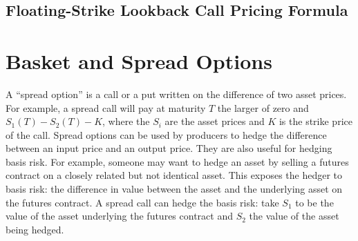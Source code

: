 \subsection*{Floating-Strike Lookback Call Pricing Formula}

\section{Basket and Spread Options}\label{s_baskets}

A ``spread option''   is a call or a put written on the difference of two asset prices.  For example, a spread call will pay at maturity $T$ the larger of zero and $S_1(T)-S_2(T)-K$, where the $S_i$ are the asset prices and $K$ is the strike price of the call.  Spread options can be used by producers to hedge the difference between an input price and an output price.  They are also useful for hedging basis risk.  For example, someone may want to hedge an asset by selling a futures contract on a closely related but not identical asset.  This exposes the hedger to basis risk: the difference in value between the asset and the underlying asset on the futures contract.  A spread call can hedge the basis risk: take $S_1$ to be the value of the asset underlying the futures contract and $S_2$ the value of the asset being hedged.

